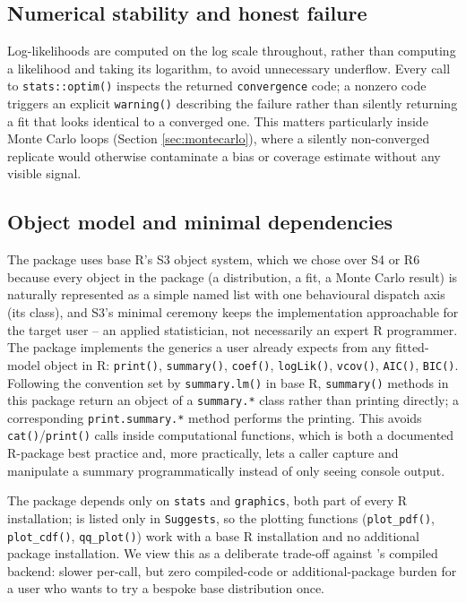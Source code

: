 \subsection{Numerical stability and honest failure}

Log-likelihoods are computed on the log scale throughout, rather than
computing a likelihood and taking its logarithm, to avoid unnecessary
underflow. Every call to \texttt{stats::optim()} inspects the returned
\texttt{convergence} code; a nonzero code triggers an explicit
\texttt{warning()} describing the failure rather than silently returning
a fit that looks identical to a converged one. This matters
particularly inside Monte Carlo loops (Section \ref{sec:montecarlo}),
where a silently non-converged replicate would otherwise contaminate a
bias or coverage estimate without any visible signal.

\subsection{Object model and minimal dependencies}

The package uses base R's S3 object system, which we chose over S4 or
R6 because every object in the package (a distribution, a fit, a Monte
Carlo result) is naturally represented as a simple named list with one
behavioural dispatch axis (its class), and S3's minimal ceremony keeps
the implementation approachable for the target user -- an applied
statistician, not necessarily an expert R programmer. The package
implements the generics a user already expects from any fitted-model
object in R: \texttt{print()}, \texttt{summary()}, \texttt{coef()},
\texttt{logLik()}, \texttt{vcov()}, \texttt{AIC()}, \texttt{BIC()}.
Following the convention set by \texttt{summary.lm()} in base R,
\texttt{summary()} methods in this package return an object of a
\texttt{summary.*} class rather than printing directly; a corresponding
\texttt{print.summary.*} method performs the printing. This avoids
\texttt{cat()}/\texttt{print()} calls inside computational functions,
which is both a documented R-package best practice and, more
practically, lets a caller capture and manipulate a summary
programmatically instead of only seeing console output.

The package depends only on \texttt{stats} and \texttt{graphics}, both
part of every R installation;  is listed only in
\texttt{Suggests}, so the plotting functions (\texttt{plot\_pdf()},
\texttt{plot\_cdf()}, \texttt{qq\_plot()}) work with a base R
installation and no additional package installation. We view this as a
deliberate trade-off against 's compiled backend: slower
per-call, but zero compiled-code or additional-package burden for a
user who wants to try a bespoke base distribution once.

